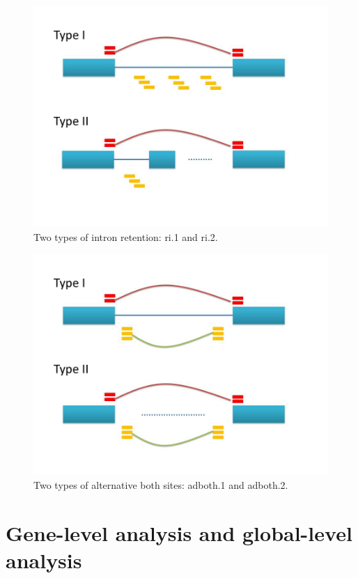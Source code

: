 \documentclass[a4paper]{article}
\begin{document}
\begin{figure}[ht]
\centering
\includegraphics[scale=0.5]{fig2.jpg}
\caption{Two types of intron retention: ri.1 and ri.2.}
\label{fig2b}
\end{figure}

\begin{figure}[ht]
\centering
\includegraphics[scale=0.5]{fig3.jpg}
\caption{Two types of alternative both sites: adboth.1 and adboth.2.}
\label{fig2c}
\end{figure}

\section{Gene-level analysis and global-level analysis}
\end{document}
